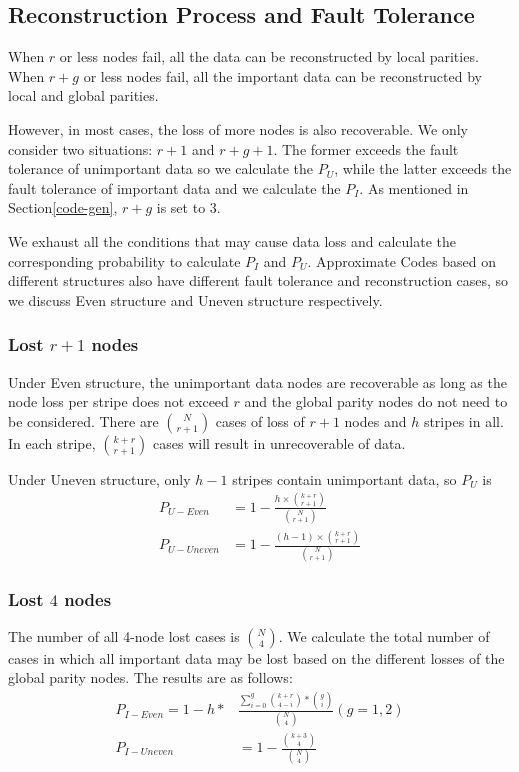 \documentclass[sigconf]{acmart}
\begin{document}
\subsection{Reconstruction Process and Fault Tolerance}\label{ReconstructionFT}
When $r$ or less nodes fail, all the data can be reconstructed by local parities.
When $r+g$ or less nodes fail, all the important data can be reconstructed by local and global parities.

However, in most cases, the loss of more nodes is also recoverable. We only consider two situations: $r+1$ and $r+g+1$.
The former exceeds the fault tolerance of unimportant data so we calculate the $P_{U}$, while the latter exceeds the fault tolerance of important data and we calculate the $P_{I}$.
As mentioned in Section\ref{code-gen}, $r+g$ is set to 3.

We exhaust all the conditions that may cause data loss and calculate the corresponding probability to calculate $P_{I}$ and $P_{U}$.
Approximate Codes based on different structures also have different fault tolerance and reconstruction cases, so we discuss Even structure and Uneven structure respectively.

\subsubsection{Lost $r+1$ nodes}
Under Even structure, the unimportant data nodes are recoverable as long as the node loss per stripe does not exceed $r$ and the global parity nodes do not need to be considered.
There are $\binom{N}{r+1}$ cases of loss of $r+1$ nodes and $h$ stripes in all. In each stripe, $\binom{k+r}{r+1}$ cases will result in unrecoverable of data.

Under Uneven structure, only $h-1$ stripes contain unimportant data, so $P_{U}$ is
\begin{align}
    P_{U-Even} &= 1 - \frac{h \times \binom{k+r}{r+1}}{\binom{N}{r+1}}\\
    P_{U-Uneven} &= 1 - \frac{(h-1) \times \binom{k+r}{r+1}}{\binom{N}{r+1}}
\end{align}

\subsubsection{Lost $4$ nodes}
The number of all 4-node lost cases is $\binom{N}{4}$.
We calculate the total number of cases in which all important data may be lost based on the different losses of the global parity nodes. The results are as follows:
\begin{align}
    P_{I-Even} = 1 - h*&\frac{\sum_{i=0}^{g} {\binom{k+r}{4-i}*\binom{g}{i}} }{\binom{N}{4}}  (g=1,2)\\
    P_{I-Uneven} &= 1 - \frac{\binom{k+3}{4}}{\binom{N}{4}}
\end{align}
\end{document}
